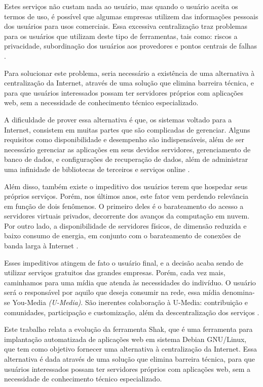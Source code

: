 Estes serviços não custam nada ao usuário, mas quando o usuário aceita os
termos de uso, é possível que algumas empresas utilizem das informações pessoais dos
usuários para usos comerciais. Essa excessiva centralização traz problemas para os usuários que utilizam deste tipo de ferramentas, tais como: riscos a privacidade, subordinação dos usuários
aos provedores e pontos centrais de falhas \cite{shak2015}. 

Para solucionar este problema, seria necessário a existência de uma alternativa à 
centralização da Internet, através de uma solução que elimina barreira técnica, e 
para que usuários interessados possam ter servidores próprios com aplicações web, 
sem a necessidade de conhecimento técnico especializado.

A dificuldade de prover essa alternativa é que, os sistemas voltado para a
Internet, consistem em muitas partes que são complicadas de gerenciar. Alguns
requisitos como disponibilidade e desempenho são indispensáveis, além de ser
necessário gerenciar as aplicações em seus devidos servidores, gerenciamento de
banco de dados, e configurações de recuperação de dados, além de administrar uma
infinidade de bibliotecas de terceiros e serviços online \cite{6265084}.

Além disso, também existe o impeditivo dos usuários terem que hospedar seus próprios serviços. Porém, nos últimos anos, este fator vem perdendo relevância em função de
dois fenômenos. O primeiro deles é o barateamento do acesso a servidores virtuais
privados, decorrente dos avanços da computação em nuvem. Por outro lado, a
disponibilidade de servidores físicos, de dimensão reduzida e baixo consumo de
energia, em conjunto com o barateamento de conexões de banda larga à Internet \cite{shak2015}.

Esses impeditivos atingem de fato o usuário final, e a decisão
acaba sendo de utilizar serviços gratuitos das grandes empresas. Porém, 
cada vez mais, caminhamos para uma mídia que atenda às necessidades do indivíduo. 
O usuário será o responsável por aquilo que deseja consumir na rede, essa mídia 
denomina-se You-Media \textit{(U-Media)}. São inerentes colaboração à U-Media: contribuição 
e comunidades, participação e customização, além da descentralização dos 
serviços \cite{terra2006comunicaccao}. 

Este trabalho relata a evolução da ferramenta Shak, que é uma ferramenta para implantação
automatizada de aplicações web em sistema Debian GNU/Linux, que tem como objetivo fornecer
uma alternativa à centralização da Internet. Essa alternativa é dada através de 
uma solução que elimina barreira técnica, para que usuários interessados possam 
ter servidores próprios com aplicações web, sem a necessidade de conhecimento técnico 
especializado. 

